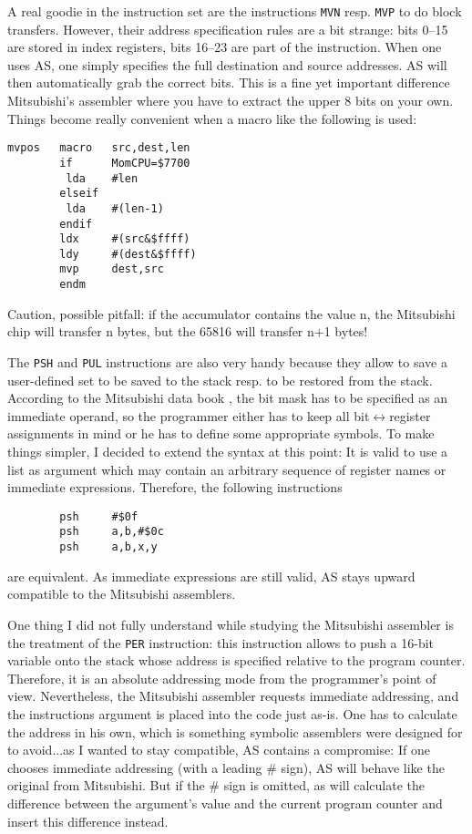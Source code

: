 \documentclass[12pt,twoside]{report}
\newcommand{\tty}[1]{{\tt #1}}
\newcommand{\asname}{{AS}}
\begin{document}
A real goodie in the instruction set are the instructions \tty{MVN} resp.
\tty{MVP} to do block transfers.  However, their address specification
rules are a bit strange: bits 0--15 are stored in index registers,
bits 16--23 are part of the instruction.  When one uses \asname{}, one
simply specifies the full destination and source addresses.  \asname{} will
then automatically grab the correct bits.  This is a fine yet
important difference  Mitsubishi's assembler where you have to
extract the upper 8 bits on your own.  Things become really
convenient when a macro like the following is used:
\begin{verbatim}
mvpos   macro   src,dest,len
        if      MomCPU=$7700
         lda    #len
        elseif
         lda    #(len-1)
        endif
        ldx     #(src&$ffff)
        ldy     #(dest&$ffff)
        mvp     dest,src
        endm
\end{verbatim}
Caution, possible pitfall: if the accumulator contains the value n,
the Mitsubishi chip will transfer n bytes, but the 65816 will
transfer n+1 bytes!

The \tty{PSH} and \tty{PUL} instructions are also very handy because they
allow to save a user-defined set to be saved to the stack resp. to be
restored from the stack.  According to the Mitsubishi data book
\cite{Mit16}, the bit mask has to be specified as an immediate operand, so
the programmer either has to keep all bit$\leftrightarrow$register
assignments in mind or he has to define some appropriate symbols.  To make
things simpler, I decided to extend the syntax at this point: It is valid
to use a list as argument which may contain an arbitrary sequence of
register names or immediate expressions.  Therefore, the following
instructions
\begin{verbatim}
        psh     #$0f
        psh     a,b,#$0c
        psh     a,b,x,y

\end{verbatim}
are equivalent.  As immediate expressions are still valid, \asname{} stays
upward compatible to the Mitsubishi assemblers.

One thing I did not fully understand while studying the Mitsubishi
assembler is the treatment of the \tty{PER} instruction: this instruction
allows to push a 16-bit variable onto the stack whose address is
specified relative to the program counter.  Therefore, it is an
absolute addressing mode from the programmer's point of view.
Nevertheless, the Mitsubishi assembler requests immediate addressing,
and the instructions argument is placed into the code just as-is.
One has to calculate the address in his own, which is something
symbolic assemblers were designed for to avoid...as I wanted to stay
compatible, \asname{} contains a compromise:  If one chooses immediate
addressing (with a leading \# sign), \asname{} will behave like the original
from Mitsubishi.  But if the \# sign is omitted, as will calculate the
difference between the argument's value and the current program
counter and insert this difference instead.
\end{document}
